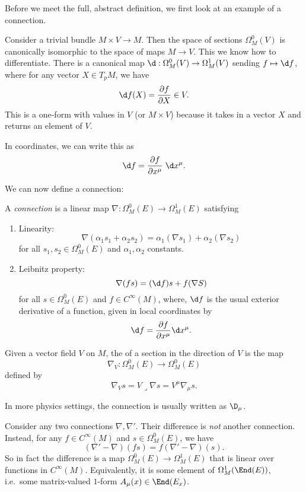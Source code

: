 \documentclass[a4paper]{article}
\begin{document}
Before we meet the full, abstract definition, we first look at an example of a connection.
\begin{eg}
  Consider a trivial bundle $M \times V \to M$. Then the space of sections $\Omega^0_M(V)$ is canonically isomorphic to the space of maps $M \to V$. This we know how to differentiate. There is a canonical map $\d: \Omega^0_M(V) \to \Omega^1_M(V)$ sending $f \mapsto \d f$, where for any vector $X \in T_p M$, we have
  \[
    \d f(X) = \frac{\partial f}{\partial X} \in V.
  \]
  This is a one-form with values in $V$ (or $M \times V$) because it takes in a vector $X$ and returns an element of $V$.

  In coordinates, we can write this as
  \[
    \d f = \frac{\partial f}{\partial x^\mu} \;\d x^\mu.
  \]
\end{eg}

We can now define a connection:
\begin{defi}[Connection]
  A \emph{connection} \index{$\nabla$} is a linear map $\nabla: \Omega_M^0(E) \to \Omega_M^1(E)$ satisfying
  \begin{enumerate}
    \item Linearity:
      \[
        \nabla(\alpha_1 s_1 + \alpha_2 s_2) = \alpha_1 (\nabla s_1) + \alpha_2( \nabla s_2)
      \]
      for all $s_1, s_2 \in \Omega_M^0(E)$ and $\alpha_1, \alpha_2$ constants.
    \item Leibnitz property:
      \[
        \nabla (fs) = (\d f) s + f (\nabla S)
      \]
      for all $s \in \Omega^0_M(E)$ and $f \in C^\infty(M)$, where, $\d f$ is the usual exterior derivative of a function, given in local coordinates by
      \[
        \d f = \frac{\partial f}{\partial x^\mu} \d x^\mu.
      \]
  \end{enumerate}
  Given a vector field $V$ on $M$, the  of a section in the direction of $V$ is the map
  \[
    \nabla_V: \Omega^0_M(E) \to \Omega^0_M(E)
  \]
  defined by
  \[
    \nabla_V s = V \lrcorner \nabla s = V^\mu \nabla_\mu s.
  \]
\end{defi}
In more physics settings, the connection is usually written as $\D_\mu$.

Consider any two connections $\nabla, \nabla'$. Their difference is \emph{not} another connection. Instead, for any $f \in C^\infty(M)$ and $s \in \Omega^0_M(E)$, we have
\[
  (\nabla' - \nabla)(fs) = f (\nabla' - \nabla)(s).
\]
So in fact the difference is a map $\Omega^0_M(E) \to \Omega_M^1(E)$ that is linear over functions in $C^\infty(M)$. Equivalently, it is some element of $\Omega^1_M(\End(E))$, i.e.\ some matrix-valued $1$-form $A_\mu (x) \in \End(E_x)$.
\end{document}
